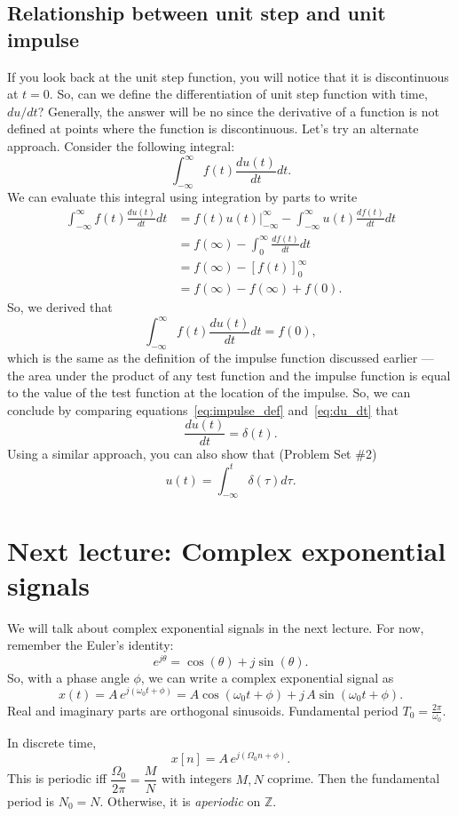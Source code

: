 \subsection{Relationship between unit step and unit impulse}
If you look back at the unit step function, you will notice that it is discontinuous at $t = 0$. So, can we define the differentiation of unit step function with time, $du/dt$? Generally, the answer will be no since the derivative of a function is not defined at points where the function is discontinuous. Let's try an alternate approach. Consider the following integral:
\[
\int_{-\infty}^{\infty} f(t)\frac{du(t)}{dt}  dt.
\]
We can evaluate this integral using integration by parts to write
\begin{align*}
\int_{-\infty}^{\infty} f(t)\frac{du(t)}{dt}  dt &= f(t)u(t)\big|_{-\infty}^{\infty} - \int_{-\infty}^{\infty} u(t) \frac{df(t)}{dt} dt\\
&= f(\infty) - \int_{0}^{\infty} \frac{df(t)}{dt} dt\\
&= f(\infty) - [f(t)]_{0}^{\infty}\\
&= f(\infty) - f(\infty) + f(0).
\end{align*}
So, we derived that 
\begin{equation}
    \label{eq:du_dt}
    \int_{-\infty}^{\infty} f(t)\frac{du(t)}{dt}  dt = f(0),
\end{equation}
which is the same as the definition of the impulse function discussed earlier --- the area under the product of any test function and the impulse function is equal to the value of the test function at the location of the impulse. So, we can conclude by comparing equations~\eqref{eq:impulse_def} and~\eqref{eq:du_dt} that 
\[
\frac{du(t)}{dt} = \delta(t).
\]
Using a similar approach, you can also show that (Problem Set \#2)
\[
u(t) = \int_{-\infty}^{t} \delta(\tau) d\tau.
\]
\section{Next lecture: Complex exponential signals}
We will talk about complex exponential signals in the next lecture. For now, remember the Euler's identity:
\[
e^{j\theta} = \cos(\theta) + j\sin(\theta).
\]
So, with a phase angle $\phi$, we can write a complex exponential signal as
\[
x(t)=A\,e^{j(\omega_0 t+\phi)}=A\cos(\omega_0 t+\phi)+j\,A\sin(\omega_0 t+\phi).
\]
Real and imaginary parts are orthogonal sinusoids. Fundamental period $T_0=\frac{2\pi}{\omega_0}$.

In discrete time,
\[
x[n]=A\,e^{j(\Omega_0 n+\phi)}.
\]
This is periodic iff $\dfrac{\Omega_0}{2\pi}=\dfrac{M}{N}$ with integers $M,N$ coprime. Then the fundamental period is $N_0=N$. Otherwise, it is \emph{aperiodic} on $\mathbb{Z}$.

